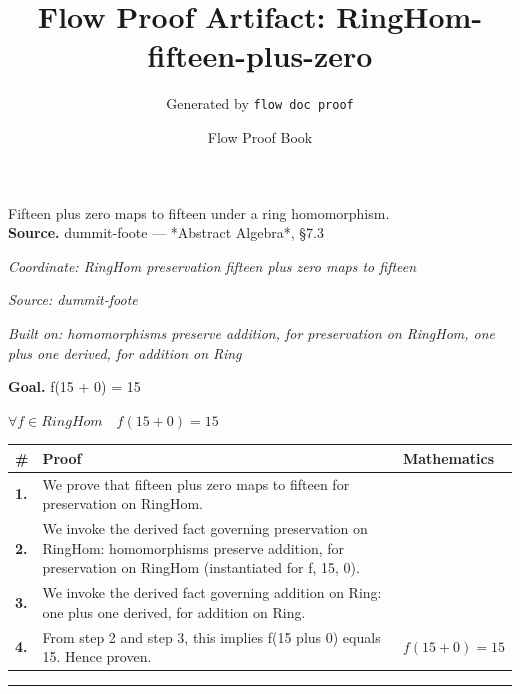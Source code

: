 \documentclass[11pt]{article}
\title{Flow Proof Artifact: RingHom-fifteen-plus-zero}
\author{Generated by \texttt{flow doc proof}}
\date{Flow Proof Book}
\theoremstyle{definition}
\begin{document}
\maketitle
Fifteen plus zero maps to fifteen under a ring homomorphism.\\[0.5em]
\textbf{Source.} dummit-foote — *Abstract Algebra*, §7.3\\[0.5em]
\bigskip
{}\par
\smallskip\noindent\textit{Coordinate: RingHom \cdot preservation \cdot fifteen plus zero maps to fifteen}\par
\smallskip\noindent\textit{Source: dummit-foote}\par
\smallskip\noindent\textit{Built on: homomorphisms preserve addition, for preservation on RingHom, one plus one derived, for addition on Ring}\par
\medskip
\noindent\textbf{Goal.} f(15 + 0) = 15\par
\noindent$\displaystyle \forall f \in RingHom\quad f(15 + 0) = 15$\par
\medskip
\noindent
\begin{tabular}{@{} >{\raggedright\arraybackslash}p{} >{\raggedright\arraybackslash}p{} >{\raggedleft\arraybackslash}p{} @{}}
\textbf{\#} & \textbf{Proof} & \textbf{Mathematics} \\
\midrule
\textbf{1.} & We prove that fifteen plus zero maps to fifteen for preservation on RingHom. & \\[0.45em]
\textbf{2.} & We invoke the derived fact governing preservation on RingHom: homomorphisms preserve addition, for preservation on RingHom (instantiated for f, 15, 0). & \\[0.45em]
\textbf{3.} & We invoke the derived fact governing addition on Ring: one plus one derived, for addition on Ring. & \\[0.45em]
\textbf{4.} & From step 2 and step 3, this implies f(15 plus 0) equals 15. Hence proven. & $\displaystyle f(15 + 0) = 15$ \\[0.45em]
\bottomrule
\end{tabular}
\label{thm:RingHom-preservation-fifteen_plus_zero_maps_to_fifteen}
\par\medskip\hrule
\end{document}
